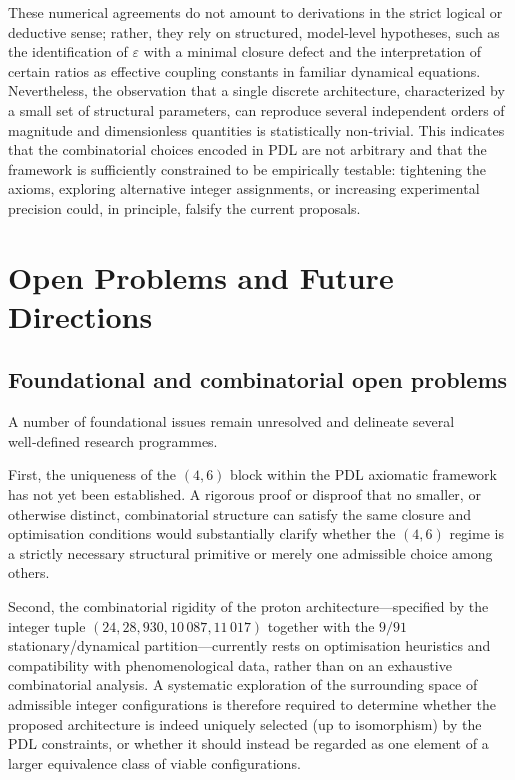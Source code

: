 \documentclass[11pt,a4paper]{article}
\begin{document}
These numerical agreements do not amount to derivations in the strict logical or deductive sense; rather, they rely on structured, model‑level hypotheses, such as the identification of $\varepsilon$ with a minimal closure defect and the interpretation of certain ratios as effective coupling constants in familiar dynamical equations.\cite{Laubscher2026FullPDL,Laubscher2026TopologicalReformulation} Nevertheless, the observation that a single discrete architecture, characterized by a small set of structural parameters, can reproduce several independent orders of magnitude and dimensionless quantities is statistically non‑trivial. This indicates that the combinatorial choices encoded in PDL are not arbitrary and that the framework is sufficiently constrained to be empirically testable: tightening the axioms, exploring alternative integer assignments, or increasing experimental precision could, in principle, falsify the current proposals.\cite{Laubscher2026FullPDL,Laubscher2026Alpha}

\section{Open Problems and Future Directions}

\subsection{Foundational and combinatorial open problems}
A number of foundational issues remain unresolved and delineate several well‑defined research programmes.\cite{Laubscher2026FullPDL,Laubscher2026CombinatorialProton} 

First, the uniqueness of the $(4,6)$ block within the PDL axiomatic framework has not yet been established. A rigorous proof or disproof that no smaller, or otherwise distinct, combinatorial structure can satisfy the same closure and optimisation conditions would substantially clarify whether the $(4,6)$ regime is a strictly necessary structural primitive or merely one admissible choice among others.\cite{Laubscher2026IntroPDL}

Second, the combinatorial rigidity of the proton architecture—specified by the integer tuple $(24,28,930,10\,087,11\,017)$ together with the $9/91$ stationary/dynamical partition—currently rests on optimisation heuristics and compatibility with phenomenological data, rather than on an exhaustive combinatorial analysis.\cite{Laubscher2026CombinatorialProton} A systematic exploration of the surrounding space of admissible integer configurations is therefore required to determine whether the proposed architecture is indeed uniquely selected (up to isomorphism) by the PDL constraints, or whether it should instead be regarded as one element of a larger equivalence class of viable configurations.
\end{document}
